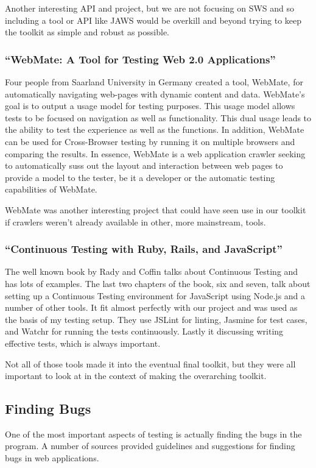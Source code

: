 \documentclass[11pt]{article}
\begin{document}
Another interesting API and project, but we are not focusing on SWS and so including a tool or API like JAWS would be overkill and beyond trying to keep the toolkit as simple and robust as possible.

\subsubsection{``WebMate: A Tool for Testing Web 2.0 Applications'' \cite{WebMate}}
Four people from Saarland University in Germany created a tool, WebMate, for automatically navigating web-pages with dynamic content and data. WebMate's goal is to output a usage model for testing purposes. This usage model allows tests to be focused on navigation as well as functionality. This dual usage leads to the ability to test the experience as well as the functions. In addition, WebMate can be used for Cross-Browser testing by running it on multiple browsers and comparing the results. In essence, WebMate is a web application crawler seeking to automatically suss out the layout and interaction between web pages to provide a model to the tester, be it a developer or the automatic testing capabilities of WebMate.

WebMate was another interesting project that could have seen use in our toolkit if crawlers weren't already available in other, more mainstream, tools.

\subsubsection{``Continuous Testing with Ruby, Rails, and JavaScript'' \cite{BookContinuousTesting}}
The well known book by Rady and Coffin talks about Continuous Testing and has lots of examples. The last two chapters of the book, six and seven, talk about setting up a Continuous Testing environment for JavaScript using Node.js and a number of other tools. It fit almost perfectly with our project and was used as the basis of my testing setup. They use JSLint for linting, Jasmine for test cases, and Watchr for running the tests continuously. Lastly it discussing writing effective tests, which is always important.

Not all of those tools made it into the eventual final toolkit, but they were all important to look at in the context of making the overarching toolkit.

\subsection{Finding Bugs}
One of the most important aspects of testing is actually finding the bugs in the program. A number of sources provided guidelines and suggestions for finding bugs in web applications.
\end{document}
